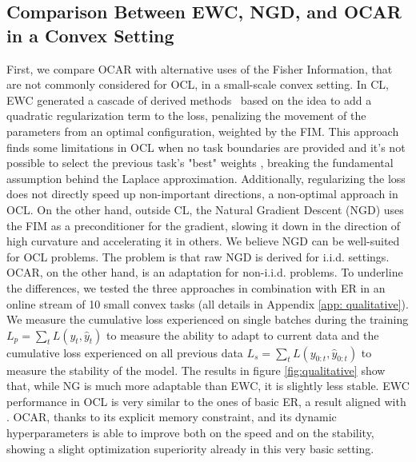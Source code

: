 \subsection{Comparison Between EWC, NGD, and OCAR in a Convex Setting}
First, we compare OCAR with alternative uses of the Fisher Information, that are not commonly considered for OCL, in a small-scale convex setting. In CL, EWC \cite{kirkpatrick2017overcoming} generated a cascade of derived methods~\cite{DBLP:conf/eccv/ChaudhryDAT18,liu2018rotate,DBLP:journals/corr/abs-1712-03847} based on the idea to add a quadratic regularization term to the loss, penalizing the movement of the parameters from an optimal configuration, weighted by the FIM. This approach finds some limitations in OCL when no task boundaries are provided and it's not possible to select the previous task's "best" weights \cite{mai2022online}, breaking the fundamental assumption behind the Laplace approximation. Additionally, regularizing the loss does not directly speed up non-important directions, a non-optimal approach in OCL. On the other hand, outside CL, the Natural Gradient Descent (NGD) \cite{amari1998natural} uses the FIM as a preconditioner for the gradient, slowing it down in the direction of high curvature and accelerating it in others. We believe NGD can be well-suited for OCL problems. The problem is that raw NGD is derived for i.i.d. settings. OCAR, on the other hand, is an adaptation for non-i.i.d. problems. To underline the differences, we tested the three approaches in combination with ER in an online stream of 10 small convex tasks (all details in Appendix \ref{app: qualitative}). We measure the cumulative loss experienced on single batches during the training $L_p = \sum_{t} L(y_{t}, \hat{y}_t)$ to measure the ability to adapt to current data and the cumulative loss experienced on all previous data $L_s = \sum_{t} L(y_{0:t}, \hat{y}_{0:t})$ to measure the stability of the model. The results in figure \ref{fig:qualitative} show that, while NG is much more adaptable than EWC, it is slightly less stable. EWC performance in OCL is very similar to the ones of basic ER, a result aligned with \cite{mai2022online}. OCAR, thanks to its explicit memory constraint, and its dynamic hyperparameters is able to improve both on the speed and on the stability, showing a slight optimization superiority already in this very basic setting.

